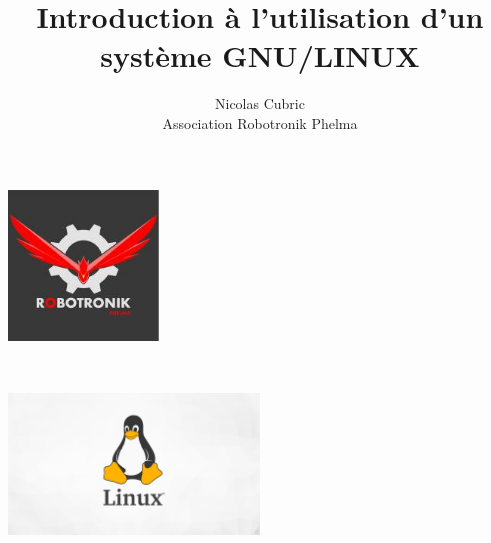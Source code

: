 \documentclass[12pt,openany]{report} %
\title{Introduction à l'utilisation d'un système GNU/LINUX}
\author{Nicolas Cubric\\Association Robotronik Phelma}
\begin{document}
\titleformat{\chapter}[block]{\bf\huge}{\thechapter}{2pc}{}   
\titlespacing*{\chapter}{0pt}{-30pt}{15pt}
\renewcommand\thechapter{\Roman{chapter}}

\titleformat{\section}[block]{\bf\Large}{\thesection}{2pc}{}
\renewcommand\thesection{\thechapter.\arabic{section}}

\titleformat{\subsection}[block]{\bf\large}{\thesubsection}{2pc}{}
\renewcommand\thesubsection{\thesection.\arabic{subsection}}


\setlength{\cftbeforetoctitleskip}{-2em}

\makeatletter

\begin{titlepage}
\begin{center}
    \includegraphics[width=0.3\textwidth]{Images/logoclub.jpg}
    
    \vfill
    
    {\large \textbf{}}\\
    \vspace*{1cm}
    {\LARGE\textbf{\@title}}
    
    \vfill
    
    \includegraphics[width=0.5\textwidth]{Images/tux.png}
    
    \vfill
    
    {\large\emph{} \textbf{}}\\
    \vspace*{0.5cm}
    {\large\textbf{\@author}}\\
    
    \vfill
    
    {\large \@date}
\end{center}
\end{titlepage}
\end{document}
